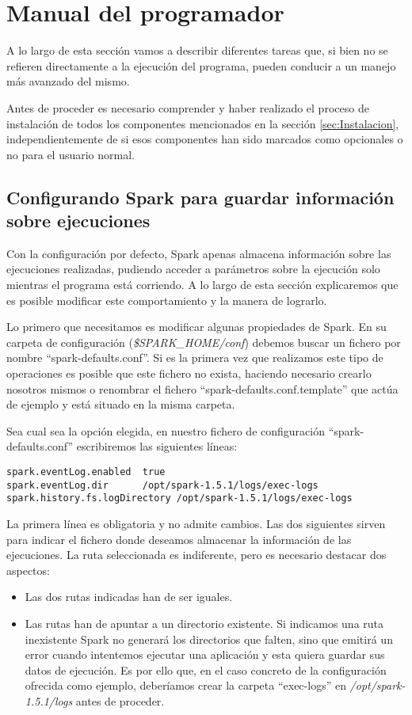 \section{Manual del programador}

A lo largo de esta sección vamos a describir diferentes tareas que, si bien no se refieren directamente a la ejecución del programa, pueden conducir a un manejo más avanzado del mismo.

Antes de proceder es necesario comprender y haber realizado el proceso de instalación de todos los componentes mencionados en la sección \ref{sec:Instalacion}, independientemente de si esos componentes han sido marcados como opcionales o no para el usuario normal.

\subsection{Configurando Spark para guardar información sobre ejecuciones}\label{subsec:configurandoSpark}

Con la configuración por defecto, Spark apenas almacena información sobre las ejecuciones realizadas, pudiendo acceder a parámetros sobre la ejecución solo mientras el programa está corriendo. A lo largo de esta sección explicaremos que es posible modificar este comportamiento y la manera de lograrlo.

Lo primero que necesitamos es modificar algunas propiedades de Spark. En su carpeta de configuración  (\textit{\$SPARK\_HOME/conf}) debemos buscar un fichero por nombre ``spark-defaults.conf''. Si es la primera vez que realizamos este tipo de operaciones es posible que este fichero no exista, haciendo necesario crearlo nosotros mismos o renombrar el fichero ``spark-defaults.conf.template'' que actúa de ejemplo y está situado en la misma carpeta.

Sea cual sea la opción elegida, en nuestro fichero de configuración ``spark-defaults.conf'' escribiremos las siguientes líneas:

\begin{lstlisting}[basicstyle=\small]
spark.eventLog.enabled	true
spark.eventLog.dir	    /opt/spark-1.5.1/logs/exec-logs
spark.history.fs.logDirectory /opt/spark-1.5.1/logs/exec-logs
\end{lstlisting}

La primera línea es obligatoria y no admite cambios. Las dos siguientes sirven para indicar el fichero donde deseamos almacenar la información de las ejecuciones. La ruta seleccionada es indiferente, pero es necesario destacar dos aspectos:
\begin{itemize}
\item Las dos rutas indicadas han de ser iguales.
\item Las rutas han de apuntar a un directorio existente. Si indicamos una ruta inexistente Spark no generará los directorios que falten, sino que emitirá un error cuando intentemos ejecutar una aplicación y esta quiera guardar sus datos de ejecución. Es por ello que, en el caso concreto de la configuración ofrecida como ejemplo, deberíamos crear la carpeta ``exec-logs'' en  \textit{/opt/spark-1.5.1/logs} antes de proceder.
\end{itemize}


